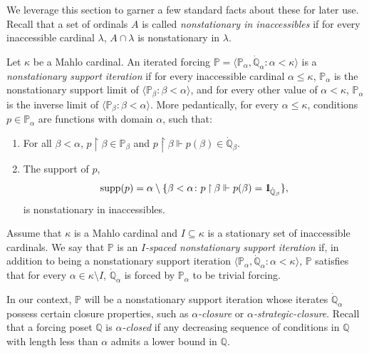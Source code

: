 \documentclass[11pt]{amsart}
\renewcommand{\restriction}{\mathbin\upharpoonright}    %
\theoremstyle{definition}
\newcounter{condition}
\theoremstyle{remark}
\newcommand\<{{<}}
\DeclareMathOperator{\supp}{supp}
\newcommand{\one}{\mathop{1\hskip-3pt {\rm l}}}
\newcommand{\po}{\mathbb{P}}
\newcommand{\qo}{\mathbb{Q}}
\newcommand{\la}{\langle}
\newcommand{\ra}{\rangle}
\begin{document}
We leverage this section to  garner a few standard facts about these for later use.  Recall that a set of ordinals $A$ is called \emph{nonstationary in inaccessibles} if for every inaccessible cardinal $\lambda$, $A\cap \lambda$ is nonstationary in $\lambda$. 

\smallskip

Let $\kappa$ be a Mahlo cardinal. An iterated forcing $\po = \langle \po_\alpha, \dot{\qo}_\alpha  \colon \alpha<\kappa\rangle$ is a \emph{nonstationary support iteration} if for every inaccessible cardinal $\alpha\leq \kappa$, $\po_\alpha$ is the nonstationary support limit of $\la \po_\beta \colon \beta<\alpha \ra$, and for every other value of $\alpha<\kappa$, $\po_\alpha$ is the inverse limit of $\la \po_\beta \colon \beta<\alpha \ra$. More pedantically, for every $\alpha\leq \kappa$,  conditions $p\in \po_\alpha$ are functions with domain $\alpha$, such that:
\begin{enumerate}
    \item For all $\beta<\alpha$, $p\restriction \beta \in \po_\beta$ and $p\restriction \beta\Vdash p(\beta)\in \dot{\qo}_\beta$.
    \item The support of $p$, $$\textstyle \supp(p) =\alpha\setminus  \{  \beta<\alpha \colon p\restriction \beta \Vdash p(\beta) = \one_{\dot{\qo}_\beta} \}, $$ is nonstationary in inaccessibles.
\end{enumerate}
Assume that $\kappa$ is a Mahlo cardinal and $I\subseteq \kappa$ is a stationary set of inaccessible cardinals. We say that $\po$ is an \emph{$I$-spaced nonstationary support iteration} if, in addition to being a nonstationary support iteration $\la \po_\alpha, \dot{\qo}_\alpha \colon \alpha<\kappa \ra$, $\po$ satisfies that for every $\alpha\in \kappa\setminus I$, $\dot{\qo}_\alpha$ is forced by $\po_\alpha$ to be trivial forcing. 

In our context, $\mathbb{P}$ will be a nonstationary support iteration whose iterates $\dot{\mathbb{Q}}_\alpha$ possess certain closure properties, such as \emph{$\alpha$-closure} or  \emph{$\alpha$-strategic-closure}. Recall that a forcing poset $\mathbb{Q}$ is  \emph{$\alpha$-closed} if any decreasing sequence of conditions in $\mathbb{Q}$ with length less than $\alpha$ admits a lower bound in $\mathbb{Q}$. 
\smallskip
\end{document}
